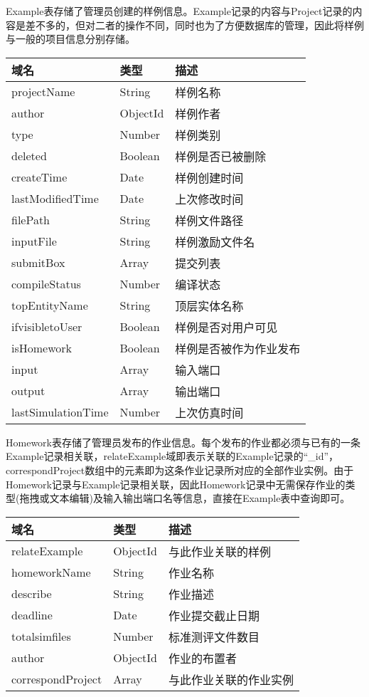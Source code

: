 Example表存储了管理员创建的样例信息。Example记录的内容与Project记录的内容是差不多的，但对二者的操作不同，同时也为了方便数据库的管理，因此将样例与一般的项目信息分别存储。
\begin{center}
	\begin{longtable}{p{}p{}p{}}
		\toprule
		 域名 & 类型 & 描述 \\
		 \midrule
		 projectName & String & 样例名称 \\
		 author & ObjectId & 样例作者 \\
		 type & Number & 样例类别 \\
		 deleted & Boolean & 样例是否已被删除 \\
		 createTime & Date & 样例创建时间 \\
		 lastModifiedTime & Date & 上次修改时间 \\
		 filePath & String & 样例文件路径 \\
		 inputFile & String & 样例激励文件名 \\
		 submitBox & Array & 提交列表 \\ 
		 compileStatus & Number & 编译状态 \\ 
		 topEntityName & String & 顶层实体名称 \\
		 ifvisibletoUser & Boolean & 样例是否对用户可见 \\
		 isHomework & Boolean & 样例是否被作为作业发布 \\
		 input & Array & 输入端口 \\ 
		 output & Array & 输出端口 \\
 		 lastSimulationTime & Number & 上次仿真时间 \\
		 \bottomrule
	\end{longtable}
\end{center}

Homework表存储了管理员发布的作业信息。每个发布的作业都必须与已有的一条Example记录相关联，relateExample域即表示关联的Example记录的“\_id”，correspondProject数组中的元素即为这条作业记录所对应的全部作业实例。由于Homework记录与Example记录相关联，因此Homework记录中无需保存作业的类型(拖拽或文本编辑)及输入输出端口名等信息，直接在Example表中查询即可。
\begin{center}
	\begin{longtable}{p{}p{}p{}}
		\toprule
		 域名 & 类型 & 描述 \\
		 \midrule
		 relateExample & ObjectId & 与此作业关联的样例 \\
		 homeworkName & String & 作业名称 \\
		 describe & String & 作业描述 \\
		 deadline & Date & 作业提交截止日期 \\
		 totalsimfiles & Number & 标准测评文件数目 \\
		 author & ObjectId & 作业的布置者 \\
		 correspondProject & Array & 与此作业关联的作业实例 \\
		 \bottomrule
	\end{longtable}
\end{center}

